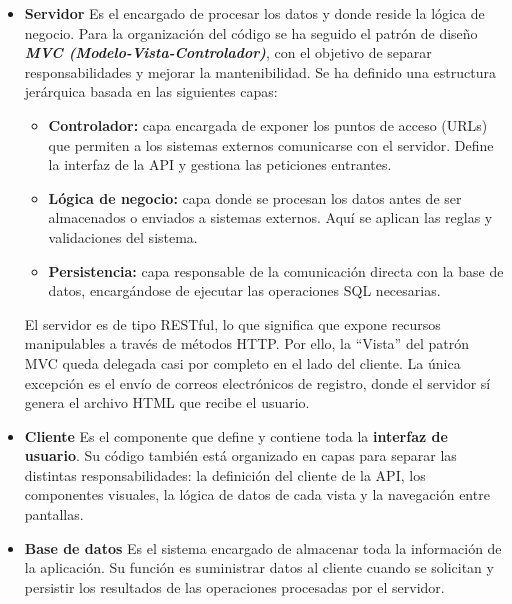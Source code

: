\begin{itemize}
    \item \textbf{Servidor}
    \newline
    Es el encargado de procesar los datos y donde reside la lógica de negocio. Para la organización del código se ha seguido el patrón de diseño \textit{\textbf{MVC (Modelo-Vista-Controlador)}}, con el objetivo de separar 
    responsabilidades y mejorar la mantenibilidad. Se ha definido una estructura jerárquica basada en las siguientes capas:

    \begin{itemize}
        \item \textbf{Controlador:} capa encargada de exponer los puntos de acceso (URLs) que permiten a los sistemas externos comunicarse con el servidor. Define la interfaz de la API y gestiona las peticiones entrantes.
        \item \textbf{Lógica de negocio:} capa donde se procesan los datos antes de ser almacenados o enviados a sistemas externos. Aquí se aplican las reglas y validaciones del sistema. 
        \item \textbf{Persistencia:} capa responsable de la comunicación directa con la base de datos, encargándose de ejecutar las operaciones SQL necesarias.
    \end{itemize}

    El servidor es de tipo RESTful, lo que significa que expone recursos manipulables a través de métodos HTTP. Por ello, la ``Vista'' del patrón MVC queda delegada casi por completo en el lado del cliente. La única excepción 
    es el envío de correos electrónicos de registro, donde el servidor sí genera el archivo HTML que recibe el usuario.

    \item \textbf{Cliente}
    \newline
    Es el componente que define y contiene toda la \textbf{interfaz de usuario}. Su código también está organizado en capas para separar las distintas responsabilidades: la definición del cliente de la API, los componentes visuales, la 
    lógica de datos de cada vista y la navegación entre pantallas.

    \item \textbf{Base de datos}
    \newline
    Es el sistema encargado de almacenar toda la información de la aplicación. Su función es suministrar datos al cliente cuando se solicitan y persistir los resultados de las operaciones procesadas por el servidor.
\end{itemize}

